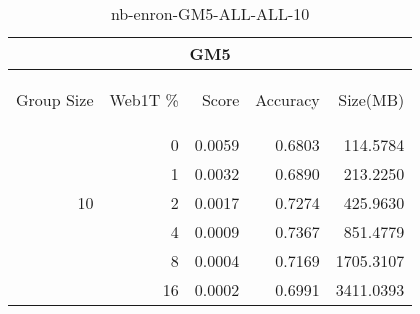 \begin{center}
\begin{table}[htbp] 
 \begin{center}
\begin{tabular}{ | r | r | r | r | r |}
\hline
\multicolumn{5}{|c|}{GM5}\\
\hline
\begin{sideways}Group Size\end{sideways} & \begin{sideways}Web1T \%\end{sideways} & \begin{sideways}Score\end{sideways} & \begin{sideways}Accuracy\end{sideways} & \begin{sideways}Size(MB)\end{sideways}\\
\hline
\multirow{5}{*}{10}
 & 0 & 0.0059 & 0.6803 & 114.5784\\ \cline{2-5}
 & 1 & 0.0032 & 0.6890 & 213.2250\\ \cline{2-5}
 & 2 & 0.0017 & 0.7274 & 425.9630\\ \cline{2-5}
 & 4 & 0.0009 & 0.7367 & 851.4779\\ \cline{2-5}
 & 8 & 0.0004 & 0.7169 & 1705.3107\\ \cline{2-5}
 & 16 & 0.0002 & 0.6991 & 3411.0393\\ \cline{2-5}
\hline
\end{tabular}
\caption{nb-enron-GM5-ALL-ALL-10}
\label{table:nb-enron-GM5-ALL-ALL-10}
\end{center}
 \end{table}
\end{center}

